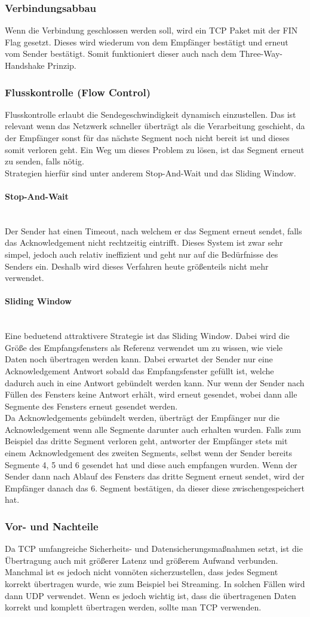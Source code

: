 \documentclass{article}
\newcommand{\paragraphlb}[1]{\paragraph{#1}\mbox{}\\}
\begin{document}
	 \subsubsection{Verbindungsabbau}
	 Wenn die Verbindung geschlossen werden soll, wird ein TCP Paket mit der FIN Flag gesetzt. Dieses wird wiederum von dem Empfänger bestätigt und erneut vom Sender bestätigt. Somit funktioniert dieser auch nach dem Three-Way-Handshake Prinzip. 
	 \subsubsection{Flusskontrolle (Flow Control)}
	 Flusskontrolle erlaubt die Sendegeschwindigkeit dynamisch einzustellen. Das ist relevant wenn das Netzwerk schneller überträgt als die Verarbeitung geschieht, da der Empfänger sonst für das nächste Segment noch nicht bereit ist und dieses somit verloren geht. Ein Weg um dieses Problem zu lösen, ist das Segment erneut zu senden, falls nötig. \\
	 Strategien hierfür sind unter anderem Stop-And-Wait und das Sliding Window.
	 \paragraphlb{Stop-And-Wait}
	 Der Sender hat einen Timeout, nach welchem er das Segment erneut sendet, falls das Acknowledgement nicht rechtzeitig eintrifft. Dieses System ist zwar sehr simpel, jedoch auch relativ ineffizient und geht nur auf die Bedürfnisse des Senders ein. Deshalb wird dieses Verfahren heute größenteils nicht mehr verwendet.
	 \paragraphlb{Sliding Window}
	 Eine beduetend attraktivere Strategie ist das Sliding Window. Dabei wird die Größe des Empfangsfensters als Referenz verwendet um zu wissen, wie viele Daten noch übertragen werden kann. Dabei erwartet der Sender nur eine Acknowledgement Antwort sobald das Empfangsfenster gefüllt ist, welche dadurch auch in eine Antwort gebündelt werden kann. Nur wenn der Sender nach Füllen des Fensters keine Antwort erhält, wird erneut gesendet, wobei dann alle Segmente des Fensters erneut gesendet werden. \\
	 Da Acknowledgements gebündelt werden, überträgt der Empfänger nur die Acknowledgement wenn alle Segmente darunter auch erhalten wurden. Falls zum Beispiel das dritte Segment verloren geht, antworter der Empfänger stets mit einem Acknowledgement des zweiten Segments, selbst wenn der Sender bereits Segmente 4, 5 und 6 gesendet hat und diese auch empfangen wurden. Wenn der Sender dann nach Ablauf des Fensters das dritte Segment erneut sendet, wird der Empfänger danach das 6. Segment bestätigen, da dieser diese zwischengespeichert hat.
	 \subsubsection{Vor- und Nachteile}
	 Da TCP umfangreiche Sicherheits- und Datensicherungsmaßnahmen setzt, ist die Übertragung auch mit größerer Latenz und größerem Aufwand verbunden. Manchmal ist es jedoch nicht vonnöten sicherzustellen, dass jedes Segment korrekt übertragen wurde, wie zum Beispiel bei Streaming. In solchen Fällen wird dann UDP verwendet. Wenn es jedoch wichtig ist, dass die übertragenen Daten korrekt und komplett übertragen werden, sollte man TCP verwenden. 
\end{document}
